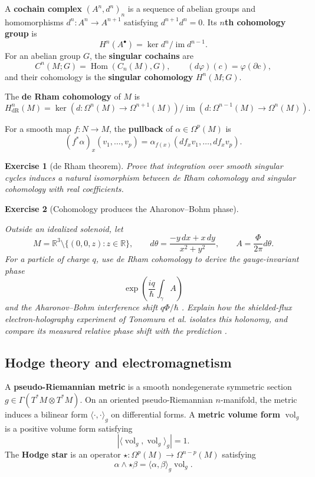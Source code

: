 \documentclass{article}
\newtheorem{exercise}{Exercise}
\begin{document}
A \textbf{cochain complex} $(A^n,d^n)_n$ is a sequence of abelian groups and
homomorphisms $d^n:A^n\to A^{n+1}$ satisfying $d^{n+1}d^n=0$. Its
\textbf{$n$th cohomology group} is
\[
H^n(A^\bullet)=\ker d^n/\operatorname{im}d^{n-1}.
\]
For an abelian group $G$, the \textbf{singular cochains} are
\[
C^n(M;G)=\operatorname{Hom}(C_n(M),G),
\qquad
(d\varphi)(c)=\varphi(\partial c),
\]
and their cohomology is the \textbf{singular cohomology} $H^n(M;G)$.

The \textbf{de Rham cohomology} of $M$ is
\[
H_{\mathrm{dR}}^n(M)
=
\ker(d\colon\Omega^n(M)\to\Omega^{n+1}(M))/
\operatorname{im}(d\colon\Omega^{n-1}(M)\to\Omega^n(M)).
\]

For a smooth map $f:N\to M$, the \textbf{pullback} of $\alpha\in\Omega^p(M)$ is
\[
(f^*\alpha)_x(v_1,\ldots,v_p)
=\alpha_{f(x)}(df_xv_1,\ldots,df_xv_p).
\]

\begin{exercise}[de Rham theorem]\leavevmode\par
\textit{Prove that integration over smooth singular cycles induces a natural isomorphism between de Rham cohomology and singular cohomology with real coefficients.}
\end{exercise}

\begin{exercise}[Cohomology produces the Aharonov--Bohm phase]
\label{ex:aharonov-bohm}\leavevmode\par
\textit{Outside an idealized solenoid, let}
\[
M=\mathbb R^3\setminus\{(0,0,z):z\in\mathbb R\},
\qquad
d\theta=\frac{-y\,dx+x\,dy}{x^2+y^2},
\qquad
A=\frac{\Phi}{2\pi}d\theta.
\]
\textit{For a particle of charge $q$, use de Rham cohomology to derive the
gauge-invariant phase}
\[
\exp\!\left(\frac{iq}{\hbar}\int_\gamma A\right)
\]
\textit{and the Aharonov--Bohm interference shift $q\Phi/\hbar$
\cite{aharonov-bohm}. Explain how the shielded-flux electron-holography
experiment of Tonomura et al. isolates this holonomy, and compare its measured
relative phase shift with the prediction \cite{tonomura-ab}.}
\end{exercise}

\subsection{Hodge theory and electromagnetism}

A \textbf{pseudo-Riemannian metric} is a smooth nondegenerate symmetric section $g\in\Gamma(T^*M\otimes T^*M)$. On an oriented pseudo-Riemannian $n$-manifold, the metric induces a bilinear form $\langle\cdot,\cdot\rangle_g$ on differential forms. A \textbf{metric volume form} $\operatorname{vol}_g$ is a positive volume form satisfying
\[
\left|\langle\operatorname{vol}_g,\operatorname{vol}_g\rangle_g\right|=1.
\]
The \textbf{Hodge star} is an operator $\star:\Omega^p(M)\to\Omega^{n-p}(M)$ satisfying
\[
\alpha\wedge\star\beta=\langle\alpha,\beta\rangle_g\operatorname{vol}_g.
\]
\end{document}
